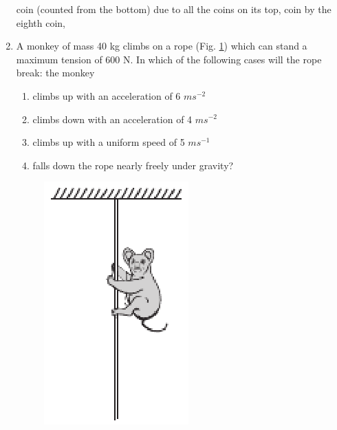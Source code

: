 \begin{enumerate}[label=\arabic*.,ref=\thesection.\theenumi]
coin (counted from the bottom) due to all the coins on its top, coin by the eighth coin,
\item A monkey of mass 40 kg climbs on a rope (Fig. \ref{fig:5.20}) which can stand a maximum tension of 600 N. In which of the
following cases will the rope break: the monkey 
\begin{enumerate}
\item climbs up with an acceleration of 6 $m s^{-2}$ 
\item climbs down with an acceleration of 4 $m s^{-2}$ 
\item  climbs up with a uniform speed of 5 $m s^{-1}$
\item  falls down the rope nearly freely under gravity?
\end{enumerate}
\begin{figure}[!ht]
\centering
\includegraphics[width=\columnwidth]{./figs/11-1/5/5.20.eps}
\caption{}
\label{fig:5.20}
\end{figure} 


\end{enumerate}
